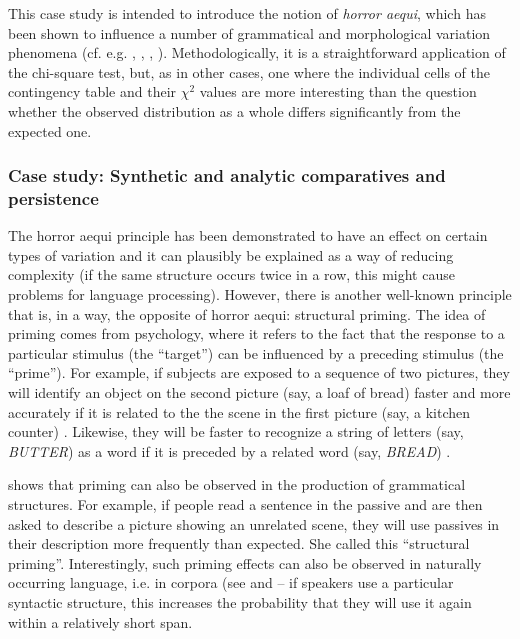 This case study is intended to introduce the notion of \textit{horror aequi}, which has been shown to influence a number of grammatical and morphological variation phenomena (cf. e.g. \citealt{rohdenburg_cognitive_2003}, \citealt{rohdenburg_role_2003}, \citealt{rudanko_more_2003}, \citealt{gries_modeling_2010}). Methodologically, it is a straightforward application of the chi-square test, but, as in other cases, one where the individual cells of the contingency table and their $\chi^2$ values are more interesting than the question whether the observed distribution as a whole differs significantly from the expected one.

\subsubsection{Case study: Synthetic and analytic comparatives and persistence}
\label{sec:syntheticandanalyticcomparativesandpersistence}

The horror aequi principle has been demonstrated to have an effect on certain types of variation and it can plausibly be explained as a way of reducing complexity (if the same structure occurs twice in a row, this might cause problems for language processing). However, there is another well-known principle that is, in a way, the opposite of horror aequi: structural priming. The idea of priming comes from psychology, where it refers to the fact that the response to a particular stimulus (the ``target'') can be influenced by a preceding stimulus (the ``prime''). For example, if subjects are exposed to a sequence of two pictures, they will identify an object on the second picture (say, a loaf of bread) faster and more accurately if it is related to the the scene in the first picture (say, a kitchen counter) \citep[cf.][]{palmer_effects_1975}. Likewise, they will be faster to recognize a string of letters (say, \textit{BUTTER}) as a word if it is preceded by a related word (say, \textit{BREAD}) \citep[cf.][]{meyer_facilitation_1971}.

\citet{bock_syntactic_1986} shows that priming can also be observed in the production of grammatical structures. For example, if people read a sentence in the passive and are then asked to describe a picture showing an unrelated scene, they will use passives in their description more frequently than expected. She called this ``structural priming''. Interestingly, such priming effects can also be observed in naturally occurring language, i.e. in corpora (see \citet{gries_syntactic_2005} and \citet{szmrecsanyi_morphosyntactic_2006} -- if speakers use a particular syntactic structure, this increases the probability that they will use it again within a relatively short span.

